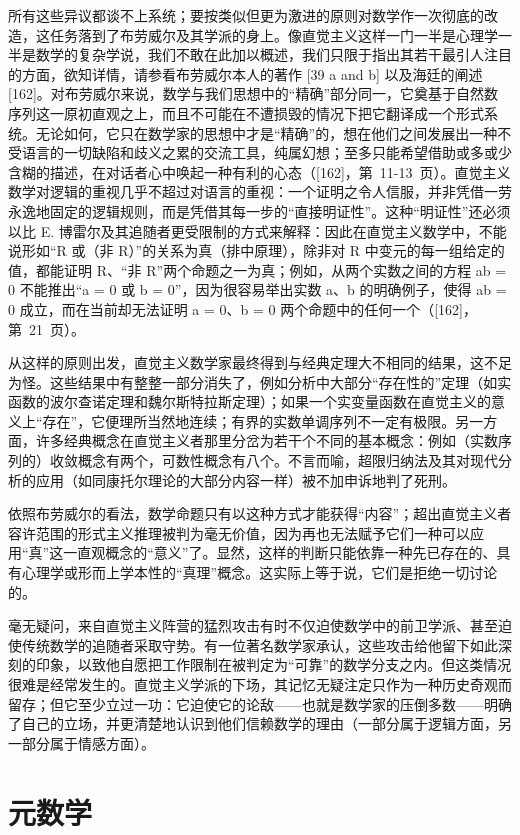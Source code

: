 所有这些异议都谈不上系统；要按类似但更为激进的原则对数学作一次彻底的改造，这任务落到了布劳威尔及其学派的身上。像直觉主义这样一门一半是心理学一半是数学的复杂学说，我们不敢在此加以概述，我们只限于指出其若干最引人注目的方面，欲知详情，请参看布劳威尔本人的著作 {[}39 a and b{]} 以及海廷的阐述 {[}162{]}。对布劳威尔来说，数学与我们思想中的“精确”部分同一，它奠基于自然数序列这一原初直观之上，而且不可能在不遭损毁的情况下把它翻译成一个形式系统。无论如何，它只在数学家的思想中才是“精确”的，想在他们之间发展出一种不受语言的一切缺陷和歧义之累的交流工具，纯属幻想；至多只能希望借助或多或少含糊的描述，在对话者心中唤起一种有利的心态（{[}162{]}，第~11-13~页）。直觉主义数学对逻辑的重视几乎不超过对语言的重视：一个证明之令人信服，并非凭借一劳永逸地固定的逻辑规则，而是凭借其每一步的“直接明证性”。这种“明证性”还必须以比 E. 博雷尔及其追随者更受限制的方式来解释：因此在直觉主义数学中，不能说形如“R 或（非 R）”的关系为真（排中原理），除非对 R 中变元的每一组给定的值，都能证明 R、“非 R”两个命题之一为真；例如，从两个实数之间的方程 ab = 0 不能推出“a = 0 或 b = 0”，因为很容易举出实数 a、b 的明确例子，使得 ab = 0 成立，而在当前却无法证明 a = 0、b = 0 两个命题中的任何一个（{[}162{]}，第~21~页）。

从这样的原则出发，直觉主义数学家最终得到与经典定理大不相同的结果，这不足为怪。这些结果中有整整一部分消失了，例如分析中大部分“存在性的”定理（如实函数的波尔查诺定理和魏尔斯特拉斯定理）；如果一个实变量函数在直觉主义的意义上“存在”，它便理所当然地连续；有界的实数单调序列不一定有极限。另一方面，许多经典概念在直觉主义者那里分岔为若干个不同的基本概念：例如（实数序列的）收敛概念有两个，可数性概念有八个。不言而喻，超限归纳法及其对现代分析的应用（如同康托尔理论的大部分内容一样）被不加申诉地判了死刑。

依照布劳威尔的看法，数学命题只有以这种方式才能获得“内容”；超出直觉主义者容许范围的形式主义推理被判为毫无价值，因为再也无法赋予它们一种可以应用“真”这一直观概念的“意义”了。显然，这样的判断只能依靠一种先已存在的、具有心理学或形而上学本性的“真理”概念。这实际上等于说，它们是拒绝一切讨论的。

毫无疑问，来自直觉主义阵营的猛烈攻击有时不仅迫使数学中的前卫学派、甚至迫使传统数学的追随者采取守势。有一位著名数学家承认，这些攻击给他留下如此深刻的印象，以致他自愿把工作限制在被判定为“可靠”的数学分支之内。但这类情况很难是经常发生的。直觉主义学派的下场，其记忆无疑注定只作为一种历史奇观而留存；但它至少立过一功：它迫使它的论敌——也就是数学家的压倒多数——明确了自己的立场，并更清楚地认识到他们信赖数学的理由（一部分属于逻辑方面，另一部分属于情感方面）。

\section*{元数学}
{}


